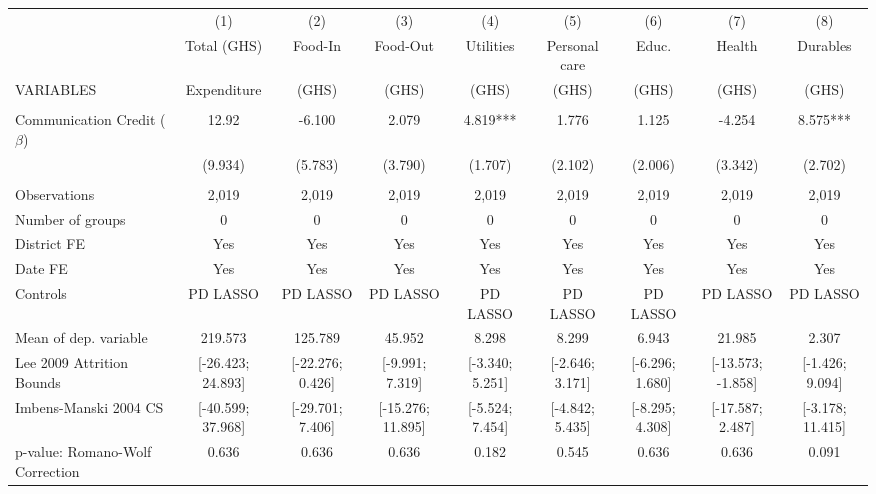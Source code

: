 \begin{tabular}{lcccccccc} \hline
 & (1) & (2) & (3) & (4) & (5) & (6) & (7) & (8) \\
 & Total (GHS) & Food-In & Food-Out & Utilities & Personal care & Educ. & Health & Durables \\
VARIABLES & Expenditure & (GHS) & (GHS) & (GHS) & (GHS) & (GHS) & (GHS) & (GHS) \\ \hline
 &  &  &  &  &  &  &  &  \\
Communication Credit ($\beta$) & 12.92 & -6.100 & 2.079 & 4.819*** & 1.776 & 1.125 & -4.254 & 8.575*** \\
 & (9.934) & (5.783) & (3.790) & (1.707) & (2.102) & (2.006) & (3.342) & (2.702) \\
 &  &  &  &  &  &  &  &  \\
Observations & 2,019 & 2,019 & 2,019 & 2,019 & 2,019 & 2,019 & 2,019 & 2,019 \\
Number of groups & 0 & 0 & 0 & 0 & 0 & 0 & 0 & 0 \\
District FE & Yes & Yes & Yes & Yes & Yes & Yes & Yes & Yes \\
Date FE & Yes & Yes & Yes & Yes & Yes & Yes & Yes & Yes \\
Controls & PD LASSO & PD LASSO & PD LASSO & PD LASSO & PD LASSO & PD LASSO & PD LASSO & PD LASSO \\
Mean of dep. variable & 219.573 & 125.789 & 45.952 & 8.298 & 8.299 & 6.943 & 21.985 & 2.307 \\
Lee 2009 Attrition Bounds & [-26.423; 24.893] & [-22.276; 0.426] & [-9.991; 7.319] & [-3.340; 5.251] & [-2.646; 3.171] & [-6.296; 1.680] & [-13.573; -1.858] & [-1.426; 9.094] \\
Imbens-Manski 2004 CS & [-40.599; 37.968] & [-29.701; 7.406] & [-15.276; 11.895] & [-5.524; 7.454] & [-4.842; 5.435] & [-8.295; 4.308] & [-17.587; 2.487] & [-3.178; 11.415] \\
 p-value: Romano-Wolf Correction & 0.636 & 0.636 & 0.636 & 0.182 & 0.545 & 0.636 & 0.636 & 0.091 \\ \hline
\end{tabular}
